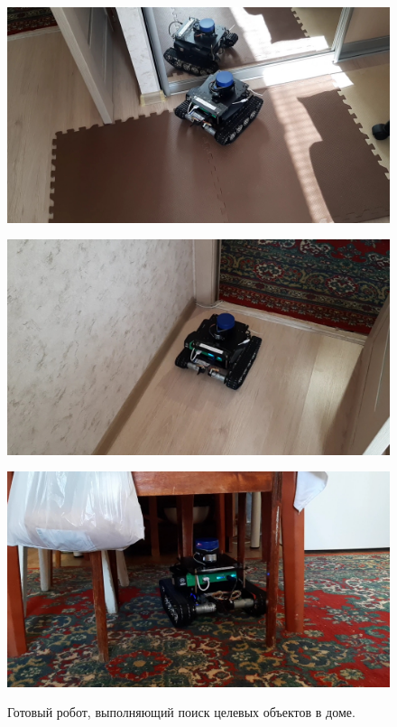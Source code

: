 \documentclass[12pt,a4paper]{scrartcl}
\begin{document}
			\begin{figure}[ht]
  				\begin{minipage}[b][][b]{0.32\linewidth}\centering
  					  \includegraphics[width=1\linewidth]{robot-complete1.jpg} \\
  				\end{minipage}
  				\hfill
  				\begin{minipage}[b][][b]{0.32\linewidth}\centering
 					   \includegraphics[width=1\linewidth]{robot-complete2.jpg} \\
 				 \end{minipage}
 				 \hfill
				  \begin{minipage}[b][][b]{0.32\linewidth}\centering
 					   \includegraphics[width=1\linewidth]{robot-complete3.jpg} \\
  				 \end{minipage}
 				 \caption{Готовый робот, выполняющий поиск целевых объектов в доме.}
				  \label{fig:robot-complete}
			\end{figure}
			
\end{document}
